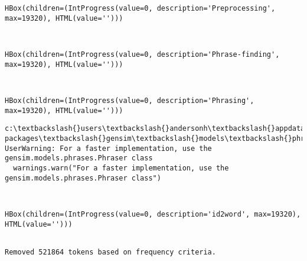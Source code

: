 \documentclass[11pt]{article}
\begin{document}
    
    \begin{verbatim}
HBox(children=(IntProgress(value=0, description='Preprocessing', max=19320), HTML(value='')))
    \end{verbatim}

    
    \begin{Verbatim}[commandchars=\\\{\}]


    \end{Verbatim}

    
    \begin{verbatim}
HBox(children=(IntProgress(value=0, description='Phrase-finding', max=19320), HTML(value='')))
    \end{verbatim}

    
    \begin{Verbatim}[commandchars=\\\{\}]


    \end{Verbatim}

    
    \begin{verbatim}
HBox(children=(IntProgress(value=0, description='Phrasing', max=19320), HTML(value='')))
    \end{verbatim}

    
    \begin{Verbatim}[commandchars=\\\{\}]
c:\textbackslash{}users\textbackslash{}andersonh\textbackslash{}appdata\textbackslash{}local\textbackslash{}programs\textbackslash{}python\textbackslash{}python36\textbackslash{}lib\textbackslash{}site-packages\textbackslash{}gensim\textbackslash{}models\textbackslash{}phrases.py:486: UserWarning: For a faster implementation, use the gensim.models.phrases.Phraser class
  warnings.warn("For a faster implementation, use the gensim.models.phrases.Phraser class")

    \end{Verbatim}

    \begin{Verbatim}[commandchars=\\\{\}]


    \end{Verbatim}

    
    \begin{verbatim}
HBox(children=(IntProgress(value=0, description='id2word', max=19320), HTML(value='')))
    \end{verbatim}

    
    \begin{Verbatim}[commandchars=\\\{\}]

Removed 521864 tokens based on frequency criteria.

    \end{Verbatim}
\end{document}
